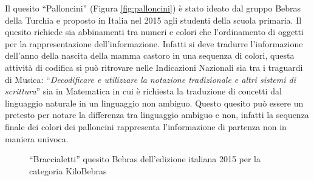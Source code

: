 \documentclass[12pt]{report}
\begin{document}
Il quesito ``Palloncini'' (Figura \ref{fig:palloncini}) è stato ideato dal gruppo Bebras della Turchia e proposto in Italia nel 2015 agli studenti della scuola primaria. Il quesito richiede sia abbinamenti tra numeri e colori che l'ordinamento di oggetti per la rappresentazione dell'informazione.
Infatti si deve tradurre l'informazione dell'anno della nascita della mamma castoro in una sequenza di colori, questa attività di codifica si può ritrovare nelle Indicazioni Nazionali sia tra i traguardi di Musica: ``\textit{Decodificare e utilizzare la notazione tradizionale e altri sistemi di scrittura}'' sia in Matematica in cui è richiesta la traduzione di concetti dal linguaggio naturale in un linguaggio non ambiguo. Questo quesito può essere un pretesto per notare la differenza tra linguaggio ambiguo e non, infatti la sequenza finale dei colori dei palloncini rappresenta l'informazione di partenza non in maniera univoca.



\bigskip
\begin{figure}[h]
	\centering
	\caption{``Braccialetti'' quesito Bebras dell'edizione italiana 2015 per la categoria KiloBebras}\label{fig:braccialetti}
\end{figure}
\end{document}
